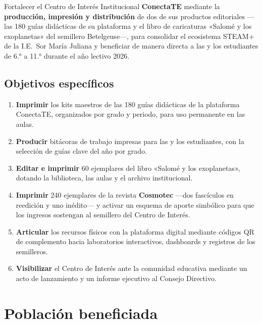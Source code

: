 \documentclass[12pt, letterpaper]{article}
\newcommand{\conectate}{\textbf{ConectaTE}}
\begin{document}
Fortalecer el Centro de Interés Institucional \conectate{} mediante la \textbf{producción, impresión y distribución} de dos de sus productos editoriales —las 180 guías didácticas de su plataforma y el libro de caricaturas «Salomé y los exoplanetas» del semillero Betelgeuse—, para consolidar el ecosistema STEAM+ de la I.E.\ Sor María Juliana y beneficiar de manera directa a las y los estudiantes de 6.°{} a 11.°{} durante el año lectivo 2026.

\subsection{Objetivos específicos}

\begin{enumerate}[label=\textbf{\color{smjAzul}OE\arabic*.}, leftmargin=*]
  \item \textbf{Imprimir} los kits maestros de las 180 guías didácticas de la plataforma ConectaTE, organizados por grado y periodo, para uso permanente en las aulas.
  \item \textbf{Producir} bitácoras de trabajo impresas para las y los estudiantes, con la selección de guías clave del año por grado.
  \item \textbf{Editar e imprimir} 60 ejemplares del libro «Salomé y los exoplanetas», dotando la biblioteca, las aulas y el archivo institucional.
  \item \textbf{Imprimir} 240 ejemplares de la revista \textbf{Cosmotec} —dos fascículos en reedición y uno inédito— y activar un esquema de aporte simbólico para que los ingresos sostengan al semillero del Centro de Interés.
  \item \textbf{Articular} los recursos físicos con la plataforma digital mediante códigos QR de complemento hacia laboratorios interactivos, dashboards y registros de los semilleros.
  \item \textbf{Visibilizar} el Centro de Interés ante la comunidad educativa mediante un acto de lanzamiento y un informe ejecutivo al Consejo Directivo.
\end{enumerate}

\section{Población beneficiada}
\end{document}
